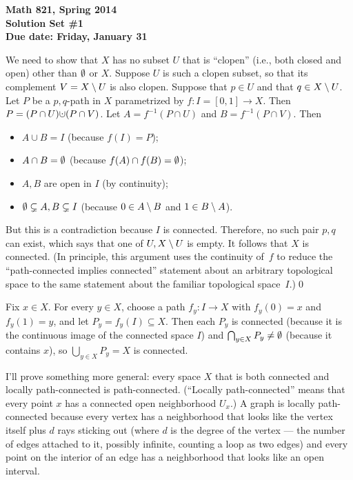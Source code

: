 

\thispagestyle{empty}
{\bf Math 821, Spring 2014\\
Solution Set \#1\\
Due date: Friday, January 31}
\bigskip


\soln We need to show that $X$ has no subset $U$ that is ``clopen'' (i.e., both closed
and open) other than $\emptyset$ or $X$.  Suppose $U$ is such a clopen subset,
so that its complement $V=X\setminus U$ is also clopen.
Suppose that $p\in U$ and that $q\in X\setminus U$.
Let $P$ be a $p,q$-path in $X$ parametrized by $f:I=[0,1]\to X$.
Then $P=(P\cap U)\dju(P\cap V)$.  Let
$A=f^{-1}(P\cap U)$ and $B=f^{-1}(P\cap V)$.  Then
\begin{itemize}
\item $A\cup B=I$ (because $f(I)=P$);
\item $A\cap B=\emptyset$ (because $f(A)\cap f(B)=\emptyset$);
\item $A,B$ are open in $I$ (by continuity);
\item $\emptyset\subsetneq A,B\subsetneq I$ (because $0\in A\setminus B$
and $1\in B\setminus A$).
\end{itemize}
But this is a contradiction because $I$ is connected.
Therefore, no such pair $p,q$ can exist, which says that one 
of $U,X\setminus U$ is empty.  It follows that $X$ is connected.
(In principle, this argument uses the continuity of~$f$
to reduce the ``path-connected implies connected'' statement
about an arbitrary topological space to the same statement about
the familiar topological space~$I$.)\hfill\qed

\altsoln Fix $x\in X$.
For every $y\in X$, choose a path $f_y:I\to X$ with
$f_y(0)=x$ and $f_y(1)=y$, and let $P_y=f_y(I)\subseteq X$.
Then each $P_y$ is connected (because it is the continuous
image of the connected space $I$) and $\bigcap_{y\in X}P_y\neq\emptyset$
(because it contains $x$), so $\bigcup_{y\in X}P_y=X$ is connected.


\soln I'll prove something more general: every space $X$ that is both
connected and locally path-connected is path-connected.
(``Locally path-connected'' means that every point $x$ has a connected open
neighborhood $U_x$.)
A graph is locally path-connected because every vertex has a neighborhood that
looks like the vertex itself plus $d$ rays sticking out (where $d$ is the degree
of the vertex --- the number of edges attached to it, possibly infinite, counting a loop as two edges)
and every point on the interior of an edge has a neighborhood that looks like
an open interval.


